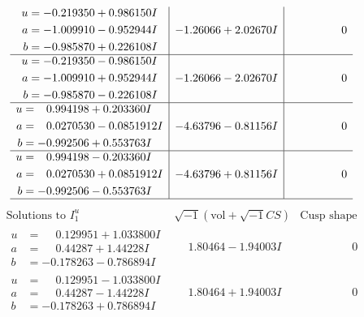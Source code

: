 \documentclass[1p]{elsarticle_modified}
\theoremstyle{definition}
\newcommand{\I}{\sqrt{-1}}
\begin{document}
$$\begin{array}{c|c|c}
\begin{aligned}
u &= -0.219350 + 0.986150 I \\
a &= -1.009910 - 0.952944 I \\
b &= -0.985870 + 0.226108 I\end{aligned}
 & -1.26066 + 2.02670 I & \phantom{-0.000000 } 0 \\ \hline\begin{aligned}
u &= -0.219350 - 0.986150 I \\
a &= -1.009910 + 0.952944 I \\
b &= -0.985870 - 0.226108 I\end{aligned}
 & -1.26066 - 2.02670 I & \phantom{-0.000000 } 0 \\ \hline\begin{aligned}
u &= \phantom{-}0.994198 + 0.203360 I \\
a &= \phantom{-}0.0270530 - 0.0851912 I \\
b &= -0.992506 + 0.553763 I\end{aligned}
 & -4.63796 - 0.81156 I & \phantom{-0.000000 } 0 \\ \hline\begin{aligned}
u &= \phantom{-}0.994198 - 0.203360 I \\
a &= \phantom{-}0.0270530 + 0.0851912 I \\
b &= -0.992506 - 0.553763 I\end{aligned}
 & -4.63796 + 0.81156 I & \phantom{-0.000000 } 0\\
 \hline 
 \end{array}$$\newpage$$\begin{array}{c|c|c}  
\text{Solutions to }I^u_{1}& \I (\text{vol} + \sqrt{-1}CS) & \text{Cusp shape}\\
 \hline 
\begin{aligned}
u &= \phantom{-}0.129951 + 1.033800 I \\
a &= \phantom{-}0.44287 + 1.44228 I \\
b &= -0.178263 - 0.786894 I\end{aligned}
 & \phantom{-}1.80464 - 1.94003 I & \phantom{-0.000000 } 0 \\ \hline\begin{aligned}
u &= \phantom{-}0.129951 - 1.033800 I \\
a &= \phantom{-}0.44287 - 1.44228 I \\
b &= -0.178263 + 0.786894 I\end{aligned}
 & \phantom{-}1.80464 + 1.94003 I & \phantom{-0.000000 } 0 \\ \hline\begin{aligned}

\end{aligned}
\end{array}$$
\end{document}
